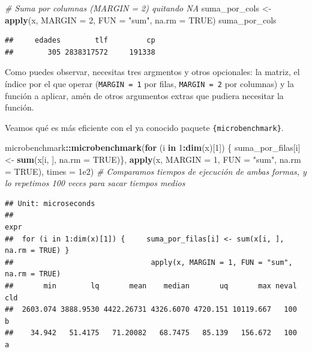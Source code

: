 \documentclass[11pt,]{book}
\newenvironment{Shaded}{\begin{snugshade}}{\end{snugshade}}
\newcommand{\CommentTok}[1]{\textcolor[rgb]{0.37,0.37,0.37}{\textit{#1}}}
\newcommand{\ControlFlowTok}[1]{\textcolor[rgb]{0.27,0.27,0.27}{\textbf{#1}}}
\newcommand{\DataTypeTok}[1]{\textcolor[rgb]{0.27,0.27,0.27}{#1}}
\newcommand{\DecValTok}[1]{\textcolor[rgb]{0.06,0.06,0.06}{#1}}
\newcommand{\FloatTok}[1]{\textcolor[rgb]{0.06,0.06,0.06}{#1}}
\newcommand{\KeywordTok}[1]{\textcolor[rgb]{0.27,0.27,0.27}{\textbf{#1}}}
\newcommand{\NormalTok}[1]{#1}
\newcommand{\OperatorTok}[1]{\textcolor[rgb]{0.43,0.43,0.43}{\textbf{#1}}}
\newcommand{\OtherTok}[1]{\textcolor[rgb]{0.37,0.37,0.37}{#1}}
\newcommand{\StringTok}[1]{\textcolor[rgb]{0.5,0.5,0.5}{#1}}
\begin{document}
\begin{Shaded}
\begin{Highlighting}[]
\CommentTok{# Suma por columnas (MARGIN = 2) quitando NA}
\NormalTok{suma_por_cols <-}\StringTok{ }\KeywordTok{apply}\NormalTok{(x, }\DataTypeTok{MARGIN =} \DecValTok{2}\NormalTok{, }\DataTypeTok{FUN =} \StringTok{"sum"}\NormalTok{, }\DataTypeTok{na.rm =} \OtherTok{TRUE}\NormalTok{)}
\NormalTok{suma_por_cols}
\end{Highlighting}
\end{Shaded}

\begin{verbatim}
##     edades        tlf         cp 
##        305 2838317572     191338
\end{verbatim}

Como puedes observar, necesitas tres argmentos y otros opcionales: la matriz, el índice por el que operar (\texttt{MARGIN\ =\ 1} por filas, \texttt{MARGIN\ =\ 2} por columnas) y la función a aplicar, amén de otros argumentos extras que pudiera necesitar la función.

Veamos qué es más eficiente con el ya conocido paquete \texttt{\{microbenchmark\}}.

\begin{Shaded}
\begin{Highlighting}[]
\NormalTok{microbenchmark}\OperatorTok{::}\KeywordTok{microbenchmark}\NormalTok{(}\ControlFlowTok{for}\NormalTok{ (i }\ControlFlowTok{in} \DecValTok{1}\OperatorTok{:}\KeywordTok{dim}\NormalTok{(x)[}\DecValTok{1}\NormalTok{]) \{}
\NormalTok{  suma_por_filas[i] <-}\StringTok{ }\KeywordTok{sum}\NormalTok{(x[i, ], }\DataTypeTok{na.rm =} \OtherTok{TRUE}\NormalTok{)\}, }\KeywordTok{apply}\NormalTok{(x, }\DataTypeTok{MARGIN =} \DecValTok{1}\NormalTok{, }\DataTypeTok{FUN =} \StringTok{"sum"}\NormalTok{, }\DataTypeTok{na.rm =} \OtherTok{TRUE}\NormalTok{), }\DataTypeTok{times =} \FloatTok{1e2}\NormalTok{) }\CommentTok{# Comparamos tiempos de ejecución de ambas formas, y lo repetimos 100 veces para sacar tiempos medios}
\end{Highlighting}
\end{Shaded}

\begin{verbatim}
## Unit: microseconds
##                                                                           expr
##  for (i in 1:dim(x)[1]) {     suma_por_filas[i] <- sum(x[i, ], na.rm = TRUE) }
##                                apply(x, MARGIN = 1, FUN = "sum", na.rm = TRUE)
##       min        lq       mean    median       uq       max neval cld
##  2603.074 3888.9530 4422.26731 4326.6070 4720.151 10119.667   100   b
##    34.942   51.4175   71.20082   68.7475   85.139   156.672   100  a
\end{verbatim}
\end{document}
